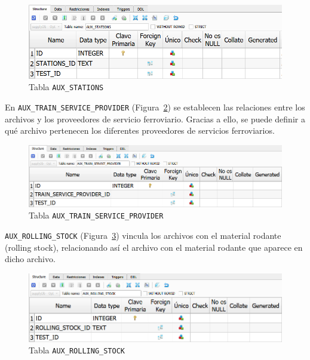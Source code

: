 \begin{figure}[H]
\centering
\includegraphics[width=.9\textwidth]{fig/Tablas base de datos/Oferta/AUX_STATIONS.png}
\caption{Tabla \texttt{AUX\_STATIONS}}
\label{fig:dbSupplyAUX_STATIONS}
\end{figure}

En \texttt{AUX\_TRAIN\_SERVICE\_PROVIDER} (Figura~\ref{fig:dbSupplyAUX_TRAIN_SERVICE_PROVIDER}) se establecen las relaciones entre los archivos y los proveedores de servicio ferroviario. Gracias a ello, se puede definir a qué archivo pertenecen los diferentes proveedores de servicios ferroviarios.

\begin{figure}[H]
\centering
\includegraphics[width=.9\textwidth]{fig/Tablas base de datos/Oferta/AUX_TRAIN_SERVICE_PROVIDER.png}
\caption{Tabla \texttt{AUX\_TRAIN\_SERVICE\_PROVIDER}}
\label{fig:dbSupplyAUX_TRAIN_SERVICE_PROVIDER}
\end{figure}

\texttt{AUX\_ROLLING\_STOCK} (Figura~\ref{fig:dbSupplyAUX_ROLLING_STOCK}) vincula los archivos con el material rodante (rolling stock), relacionando así el archivo con el material rodante que aparece en dicho archivo.

\begin{figure}[H]
\centering
\includegraphics[width=.9\textwidth]{fig/Tablas base de datos/Oferta/AUX_ROLLING_STOCK.png}
\caption{Tabla \texttt{AUX\_ROLLING\_STOCK}}
\label{fig:dbSupplyAUX_ROLLING_STOCK}
\end{figure}

